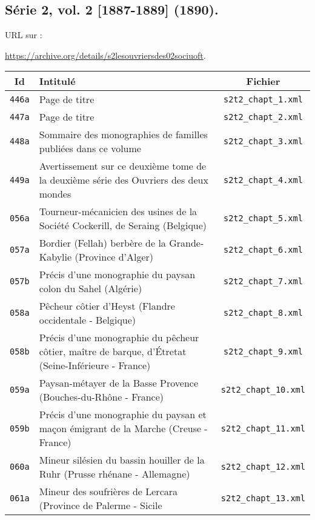 \subsection{Série 2, vol. 2 [1887-1889] (1890).}
\label{mappings2t2}

URL sur \ia{} : 

\url{https://archive.org/details/s2lesouvriersdes02sociuoft}.

\begin{center}
\begin{longtable}{ | c | p{9.5cm} | c | }
\hline
Id & Intitulé & Fichier \\ \hline
\texttt{446a} & Page de titre & \texttt{s2t2\_chapt\_1.xml} \\ \hline
\texttt{447a} & Page de titre & \texttt{s2t2\_chapt\_2.xml} \\ \hline
\texttt{448a} & Sommaire des monographies de familles publiées dans ce volume & \texttt{s2t2\_chapt\_3.xml} \\ \hline
\texttt{449a} & Avertissement sur ce deuxième tome de la deuxième série des Ouvriers des deux mondes & \texttt{s2t2\_chapt\_4.xml} \\ \hline
\texttt{056a} & Tourneur-mécanicien des usines de la Société Cockerill, de Seraing (Belgique) & \texttt{s2t2\_chapt\_5.xml} \\ \hline
\texttt{057a} & Bordier (Fellah) berbère de la Grande-Kabylie (Province d'Alger) & \texttt{s2t2\_chapt\_6.xml} \\ \hline
\texttt{057b} & Précis d'une monographie du paysan colon du Sahel (Algérie) & \texttt{s2t2\_chapt\_7.xml} \\ \hline
\texttt{058a} & Pêcheur côtier d'Heyst (Flandre occidentale - Belgique) & \texttt{s2t2\_chapt\_8.xml} \\ \hline
\texttt{058b} & Précis d'une monographie du pêcheur côtier, maître de barque, d'Étretat (Seine-Inférieure - France) & \texttt{s2t2\_chapt\_9.xml} \\ \hline
\texttt{059a} & Paysan-métayer de la Basse Provence (Bouches-du-Rhône - France) & \texttt{s2t2\_chapt\_10.xml} \\ \hline
\texttt{059b} & Précis d'une monographie du paysan et maçon émigrant de la Marche (Creuse - France) & \texttt{s2t2\_chapt\_11.xml} \\ \hline
\texttt{060a} & Mineur silésien du bassin houiller de la Ruhr (Prusse rhénane - Allemagne) & \texttt{s2t2\_chapt\_12.xml} \\ \hline
\texttt{061a} & Mineur des soufrières de Lercara (Province de Palerme - Sicile & \texttt{s2t2\_chapt\_13.xml} \\ \hline

\end{longtable}
\end{center}
